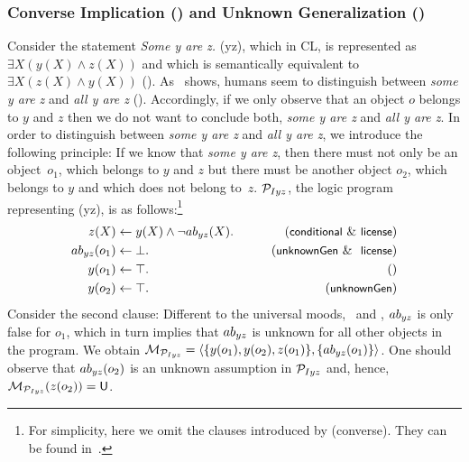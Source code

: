 \documentclass[12pt]{article}
\begin{document}
\subsubsection{Converse Implication (\converse) and Unknown Generalization (\unknownGen)}
Consider the statement \textit{Some y are z.} ({\MI yz}), which in CL, is represented as $\exists X (y(X) \wedge z(X))$
and which is semantically equivalent to $\exists X(z(X) \wedge y(X))$ (\converse).
As~\cite{khemlani:2012}
shows, humans seem to
distinguish between \textit{some y are z} and \textit{all y are z} (\unknownGen).
Accordingly, if we only observe that an object $o$ belongs to $y$ and $z$ then we do not want to conclude both, \textit{some y are z} and \textit{all y are z}.
In order to distinguish between \textit{some y are z} and \textit{all y are z}, we introduce the following principle:  If we know that \textit{some y are z}, then there must not only be an object~$o_1$, which belongs to $y$ and $z$ but there must be another object $o_2$, which belongs to
$y$ and which does not belong to~$z$.
${\cal P}_{Iyz}$, the logic program representing (\MI yz), is as follows:\footnote{For simplicity, here we omit the clauses introduced by ({\footnotesize\textsf{converse}}). They can be found in~\cite{declare:2017}.}
\begin{align}
z(X) & \leftarrow y(X) \wedge \neg \Ab_{yz}(X). & \tag{\conditionals\ \&\ \licenses}\\
\Ab_{yz}(o_1) & \leftarrow  \bot. & \tag{\unknownGen\ \& \ \licenses}\\
y(o_1) & \leftarrow  \top. & \tag{} \\
y(o_2) & \leftarrow  \top. & \tag{\unknownGen} 
\end{align}
Consider the second clause: Different to the universal moods, \ME\ and \MA, $ab_{yz}$ is only false for $o_1$, which in turn implies that 
$ab_{yz}$ is unknown for all other objects in the program.
We obtain ${\cal M}_{{\cal P}_{Iyz}}= \langle \{y(o_1), y(o_2), z(o_1)\}, \{ab_{yz}(o_1)\} \rangle$.
One should observe that  $ab_{yz}(o_2)$ is an unknown assumption in
${\cal P}_{Iyz}$ and,
hence, ${\cal M}_{{\cal P}_{Iyz}}(z(o_2)) = \mathsf{U}$.
\end{document}
